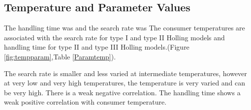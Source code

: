 \documentclass{article}
\begin{document}
\subsection{Temperature and Parameter Values}
The handling time was and the search rate was
The consumer temperatures are associated with the search rate for type I and type II Holling models and handling time for type II and type III Holling models.(Figure \ref{fig:tempparam},Table \ref{Paramtemp}). %

The search rate is smaller and less varied at intermediate temperatures, however at very low and very high temperatures, the temperature is very varied and can be very high. There is a weak negative correlation. The handling time shows a weak positive correlation with consumer temperature.
\begin{figure}[h!t]
\centering
{}\\
 \\

\end{figure}
\end{document}
